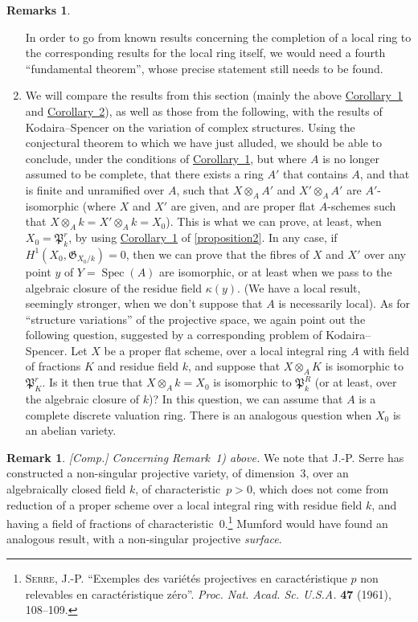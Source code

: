 \documentclass{article}
\theoremstyle{plain}
\theoremstyle{definition}
\newtheorem*{remark}{Remark}
\newtheorem*{remarks}{Remarks}
\newcommand{\fk}{\mathfrak}
\newcommand{\kres}{\kappa}
\DeclareMathOperator{\Spec}{Spec}
\begin{document}
\begin{remarks}
\begin{enumerate}[1)]
      In order to go from known results concerning the completion of a local ring to the corresponding results for the local ring itself, we would need a fourth ``fundamental theorem'', whose precise statement still needs to be found.
    \item We will compare the results from this section (mainly the above \hyperref[theorem9corollary1]{Corollary~1} and \hyperref[theorem9corollary2]{Corollary~2}), as well as those from the following, with the results of Kodaira--Spencer on the variation of complex structures.
      Using the conjectural theorem to which we have just alluded, we should be able to conclude, under the conditions of \hyperref[theorem9corollary1]{Corollary~1}, but where $A$ is no longer assumed to be complete, that there exists a ring $A'$ that contains $A$, and that is finite and unramified over $A$, such that $X\otimes_AA'$ and $X'\otimes_AA'$ are $A'$-isomorphic (where $X$ and $X'$ are given, and are proper flat $A$-schemes such that $X\otimes_Ak=X'\otimes_Ak=X_0$).
      This is what we can prove, at least, when $X_0=\fk{P}_k^r$, by using \hyperref[proposition2corollary1]{Corollary~1} of \cref{proposition2}.
      In any case, if $H^1(X_0,\fk{G}_{X_0/k})=0$, then we can prove that the fibres of $X$ and $X'$ over any point $y$ of $Y=\Spec(A)$ are isomorphic, or at least when we pass to the algebraic closure of the residue field $\kres(y)$.
      (We have a local result, seemingly stronger, when we don't suppose that $A$ is necessarily local).
      As for ``structure variations'' of the projective space, we again point out the following question, suggested by a corresponding problem of Kodaira--Spencer.
      Let $X$ be a proper flat scheme, over a local integral ring $A$ with field of fractions $K$ and residue field $k$, and suppose that $X\otimes_AK$ is isomorphic to $\fk{P}_K^r$.
      Is it then true that $X\otimes_Ak=X_0$ is isomorphic to $\fk{P}_k^R$ (or at least, over the algebraic closure of $k$)?
      In this question, we can assume that $A$ is a complete discrete valuation ring.
      There is an analogous question when $X_0$ is an abelian variety.
  \end{enumerate}
\end{remarks}

\begin{remark}
  \emph{[Comp.] Concerning Remark~1) above.}
  We note that J.-P. Serre has constructed a non-singular projective variety, of dimension~$3$, over an algebraically closed field $k$, of characteristic~$p>0$, which does not come from reduction of a proper scheme over a local integral ring with residue field $k$, and having a field of fractions of characteristic~$0$.\footnote{\textsc{Serre, J.-P.} ``Exemples des vari\'{e}t\'{e}s projectives en caract\'{e}ristique $p$ non relevables en caract\'{e}ristique z\'{e}ro''. \emph{Proc. Nat. Acad. Sc. U.S.A.} \textbf{47} (1961), 108--109.}
  Mumford would have found an analogous result, with a non-singular projective \emph{surface}.
\end{remark}
\end{document}
